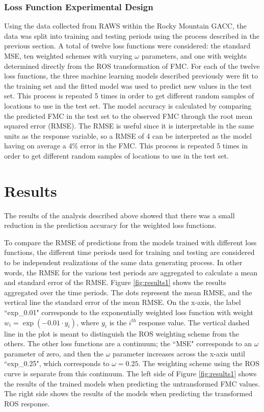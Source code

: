 \documentclass[11pt]{article}%
\begin{document}
\subsubsection{Loss Function Experimental Design}

Using the data collected from RAWS within the Rocky Mountain GACC, the data was split into training and testing periods using the process described in the previous section. A total of twelve loss functions were considered: the standard MSE, ten weighted schemes with varying $\omega$ parameters, and one with weights determined directly from the ROS transformation of FMC. For each of the twelve loss functions, the three machine learning models described previously were fit to the training set and the fitted model was used to predict new values in the test set. This process is repeated 5 times in order to get different random samples of locations to use in the test set. The model accuracy is calculated by comparing the predicted FMC in the test set to the observed FMC through the root mean squared error (RMSE). The RMSE is useful since it is interpretable in the same units as the response variable, so a RMSE of 4 can be interpreted as the model having on average a 4\% error in the FMC. This process is repeated 5 times in order to get different random samples of locations to use in the test set. 

\section{Results}

The results of the analysis described above showed that there was a small reduction in the prediction accuracy for the weighted loss functions.

To compare the RMSE of predictions from the models trained with different loss functions, the different time periods used for training and testing are considered to be independent realizations of the same data generating process. In other words, the RMSE for the various test periods are aggregated to calculate a mean and standard error of the RMSE. Figure \ref{fig:results1} shows the results aggregated over the time periods. The dots represent the mean RMSE, and the vertical line the standard error of the mean RMSE. On the x-axis, the label ``exp\_0.01" corresponds to the exponentially weighted loss function with weight $w_i = \exp(-0.01\cdot y_i)$, where $y_i$ is the $i^{th}$ response value. The vertical dashed line in the plot is meant to distinguish the ROS weighting scheme from the others. The other loss functions are a continuum; the ``MSE" corresponds to an $\omega$ parameter of zero, and then the $\omega$ parameter increases across the x-axis until ``exp\_0.25", which corresponds to $\omega=0.25$. The weighting scheme using the ROS curve is separate from this continuum. The left side of Figure \ref{fig:results1} shows the results of the trained models when predicting the untransformed FMC values. The right side shows the results of the models when predicting the transformed ROS response.
\end{document}
